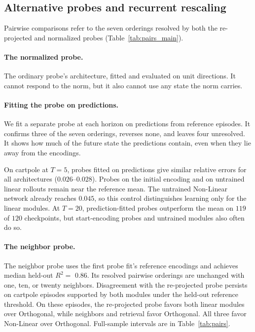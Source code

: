 \subsection{Alternative probes and recurrent rescaling}
\label{app:alternative_readouts}
Pairwise comparisons refer to the seven orderings resolved by both the re-projected and normalized probes (Table~\ref{tab:pairs_main}).

\paragraph{The normalized probe.} The ordinary probe's architecture, fitted and evaluated on unit directions. It cannot respond to the norm, but it also cannot use any state the norm carries.

\paragraph{Fitting the probe on predictions.}
We fit a separate probe at each horizon on predictions from reference episodes. It confirms three of the seven orderings, reverses none, and leaves four unresolved. It shows how much of the future state the predictions contain, even when they lie away from the encodings.

On cartpole at $T=5$, probes fitted on predictions give similar relative errors for all architectures ($0.026$--$0.028$). Probes on the initial encoding and on untrained linear rollouts remain near the reference mean. The untrained Non-Linear network already reaches $0.045$, so this control distinguishes learning only for the linear modules. At $T=20$, prediction-fitted probes outperform the mean on $119$ of $120$ checkpoints, but start-encoding probes and untrained modules also often do so.

\paragraph{The neighbor probe.}
The neighbor probe uses the first probe fit's reference encodings and achieves median held-out $R^2=$ $0.86$. Its resolved pairwise orderings are unchanged with one, ten, or twenty neighbors. Disagreement with the re-projected probe persists on cartpole episodes supported by both modules under the held-out reference threshold. On these episodes, the re-projected probe favors both linear modules over Orthogonal, while neighbors and retrieval favor Orthogonal. All three favor Non-Linear over Orthogonal. Full-sample intervals are in Table~\ref{tab:pairs}.

